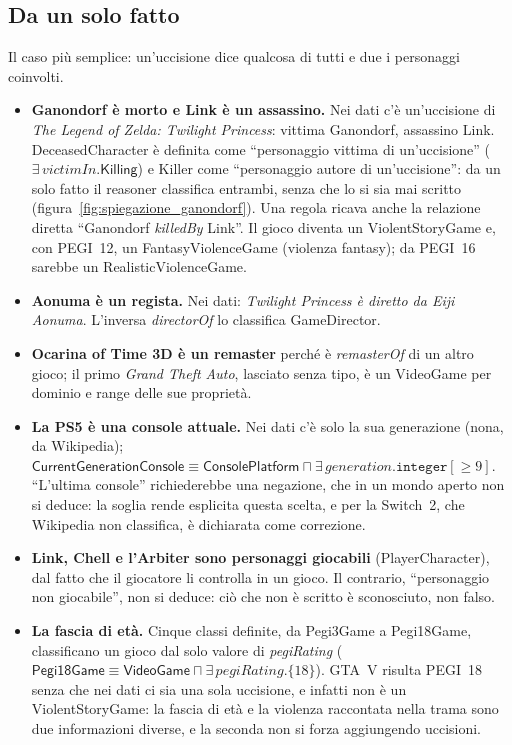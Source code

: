 \documentclass[10pt,a4paper]{article}
\newcommand{\cls}[1]{\textsf{#1}}
\newcommand{\prop}[1]{\textit{#1}}
\begin{document}
\subsection{Da un solo fatto}
Il caso più semplice: un'uccisione dice qualcosa di tutti e due i personaggi coinvolti.
\begin{itemize}
  \item \textbf{Ganondorf è morto e Link è un assassino.} Nei dati c'è un'uccisione di \emph{The Legend of Zelda: Twilight Princess}: vittima Ganondorf, assassino Link. \cls{DeceasedCharacter} è definita come ``personaggio vittima di un'uccisione'' ($\exists\,\prop{victimIn}.\cls{Killing}$) e \cls{Killer} come ``personaggio autore di un'uccisione'': da un solo fatto il reasoner classifica entrambi, senza che lo si sia mai scritto (figura~\ref{fig:spiegazione_ganondorf}). Una regola ricava anche la relazione diretta ``Ganondorf \prop{killedBy} Link''. Il gioco diventa un \cls{ViolentStoryGame} e, con PEGI~12, un \cls{FantasyViolenceGame} (violenza fantasy); da PEGI~16 sarebbe un \cls{RealisticViolenceGame}.
  \item \textbf{Aonuma è un regista.} Nei dati: \emph{Twilight Princess è diretto da Eiji Aonuma}. L'inversa \prop{directorOf} lo classifica \cls{GameDirector}.
  \item \textbf{Ocarina of Time 3D è un remaster} perché è \prop{remasterOf} di un altro gioco; il primo \emph{Grand Theft Auto}, lasciato senza tipo, è un \cls{VideoGame} per dominio e range delle sue proprietà.
  \item \textbf{La PS5 è una console attuale.} Nei dati c'è solo la sua generazione (nona, da Wikipedia); $\cls{CurrentGenerationConsole} \equiv \cls{ConsolePlatform} \sqcap \exists\,\prop{generation}.\texttt{integer}[\geq 9]$. ``L'ultima console'' richiederebbe una negazione, che in un mondo aperto non si deduce: la soglia rende esplicita questa scelta, e per la Switch~2, che Wikipedia non classifica, è dichiarata come correzione.
  \item \textbf{Link, Chell e l'Arbiter sono personaggi giocabili} (\cls{PlayerCharacter}), dal fatto che il giocatore li controlla in un gioco. Il contrario, ``personaggio non giocabile'', non si deduce: ciò che non è scritto è sconosciuto, non falso.
  \item \textbf{La fascia di età.} Cinque classi definite, da \cls{Pegi3Game} a \cls{Pegi18Game}, classificano un gioco dal solo valore di \prop{pegiRating} ($\cls{Pegi18Game} \equiv \cls{VideoGame} \sqcap \exists\,\prop{pegiRating}.\{18\}$). GTA~V risulta PEGI~18 senza che nei dati ci sia una sola uccisione, e infatti non è un \cls{ViolentStoryGame}: la fascia di età e la violenza raccontata nella trama sono due informazioni diverse, e la seconda non si forza aggiungendo uccisioni.
\end{itemize}
\end{document}
